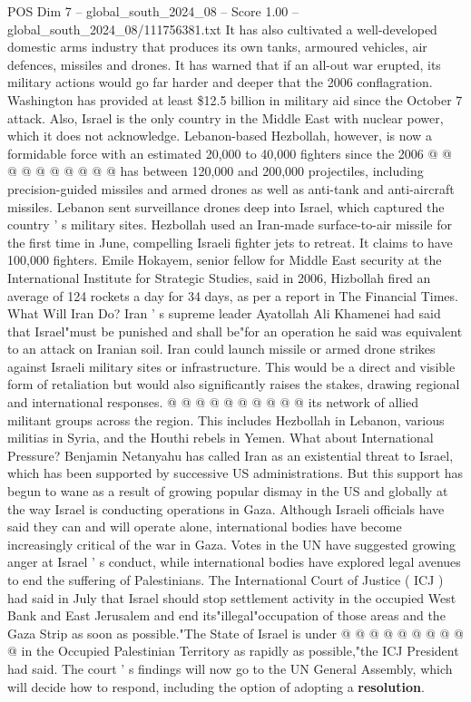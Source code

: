 \begin{textsample}{POS Dim 7 – global\_south\_2024\_08 – Score 1.00 – global\_south\_2024\_08/111756381.txt}
It has also cultivated a well-developed domestic arms industry that produces its own tanks, armoured vehicles, air defences, missiles and drones.
It has warned that if an all-out war erupted, its military actions would go far harder and deeper that the 2006 conflagration.
Washington has provided at least \$12.5 billion in military aid since the October 7 attack.
Also, Israel is the only country in the Middle East with nuclear power, which it does not acknowledge.
Lebanon-based Hezbollah, however, is now a formidable force with an estimated 20,000 to 40,000 fighters since the 2006 @ @ @ @ @ @ @ @ @ @ has between 120,000 and 200,000 projectiles, including precision-guided missiles and armed drones as well as anti-tank and anti-aircraft missiles.
Lebanon sent surveillance drones deep into Israel, which captured the country ' s military sites.
Hezbollah used an Iran-made surface-to-air missile for the first time in June, compelling Israeli fighter jets to retreat.
It claims to have 100,000 fighters.
Emile Hokayem, senior fellow for Middle East security at the International Institute for Strategic Studies, said in 2006, Hizbollah fired an average of 124 rockets a day for 34 days, as per a report in The Financial Times.
What Will Iran Do?
Iran ' s supreme leader Ayatollah Ali Khamenei had said that Israel"must be punished and shall be"for an operation he said was equivalent to an attack on Iranian soil.
Iran could launch missile or armed drone strikes against Israeli military sites or infrastructure.
This would be a direct and visible form of retaliation but would also significantly raises the stakes, drawing regional and international responses. @ @ @ @ @ @ @ @ @ @ its network of allied militant groups across the region.
This includes Hezbollah in Lebanon, various militias in Syria, and the Houthi rebels in Yemen.
What about International Pressure?
Benjamin Netanyahu has called Iran as an existential threat to Israel, which has been supported by successive US administrations.
But this support has begun to wane as a result of growing popular dismay in the US and globally at the way Israel is conducting operations in Gaza.
Although Israeli officials have said they can and will operate alone, international bodies have become increasingly critical of the war in Gaza.
Votes in the UN have suggested growing anger at Israel ' s conduct, while international bodies have explored legal avenues to end the suffering of Palestinians.
The International Court of Justice ( ICJ ) had said in July that Israel should stop settlement activity in the occupied West Bank and East Jerusalem and end its"illegal"occupation of those areas and the Gaza Strip as soon as possible."The State of Israel is under @ @ @ @ @ @ @ @ @ @ in the Occupied Palestinian Territory as rapidly as possible,"the ICJ President had said.
The court ' s findings will now go to the UN General Assembly, which will decide how to respond, including the option of adopting a \textbf{resolution}.

\end{textsample}
